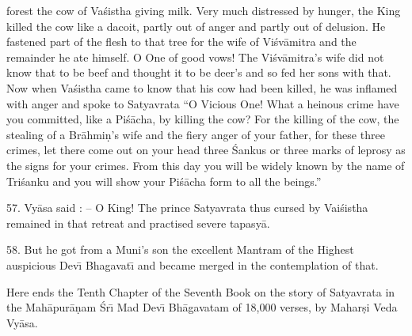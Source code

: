 forest the cow of Va\'sistha giving milk. Very much distressed by hunger, the King killed the cow like a dacoit, partly out of anger and partly out of delusion. He fastened part of the flesh to that tree for the wife of Vi\'sv\=amitra and the remainder he ate himself. O One of good vows! The Vi\'sv\=amitra's wife did not know that to be beef and thought it to be deer's and so fed her sons with that. Now when Va\'sistha came to know that his cow had been killed, he was inflamed with anger and spoke to Satyavrata ``O Vicious One! What a heinous crime have you committed, like a Pi\'s\=acha, by killing the cow? For the killing of the cow, the stealing of a Br\=ahmi\d{n}'s wife and the fiery anger of your father, for these three crimes, let there come out on your head three \'Sankus or three marks of leprosy as the signs for your crimes. From this day you will be widely known by the name of Tri\'sanku and you will show your Pi\'s\=acha form to all the beings.''

57. Vy\=asa said : -- O King! The prince Satyavrata thus cursed by Vai\'sistha remained in that retreat and practised severe tapasy\=a.

58. But he got from a Muni's son the excellent Mantram of the Highest auspicious Dev\={\i} Bhagavat\={\i} and became merged in the contemplation of that.

Here ends the Tenth Chapter of the Seventh Book on the story of Satyavrata in the Mah\=apur\=a\d{n}am \'Sr\={\i} Mad Dev\={\i} Bh\=agavatam of 18,000 verses, by Mahar\d{s}i Veda Vy\=asa.




